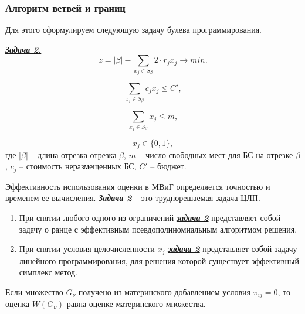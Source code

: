 \begin{frame}
    
    \frametitle{Алгоритм ветвей и границ}
    \fontsize{8pt}{7.2}\selectfont
    Для этого сформулируем следующую задачу булева программирования.

    \underline{\textit{\textbf{Задача 2.}}}
    \begin{displaymath}\label{present:task2}
        z = |\beta| - \sum\limits_{x_j \in S_\beta} 2 \cdot r_j x_j \rightarrow min.
    \end{displaymath}

    \begin{displaymath}\label{eq:part4_task2_cost}
        \sum\limits_{x_j \in S_\beta} c_j x_j \leqslant C',
    \end{displaymath}

    \begin{displaymath}\label{eq:part4_task2_m}
        \sum\limits_{x_j \in S_\beta} x_j \leqslant m,
    \end{displaymath}

    \begin{displaymath}
        x_j \in \{0, 1\},
    \end{displaymath}
    где $|\beta|$ -- длина отрезка отрезка  $\beta$, $m$ -- число свободных мест для БС на отрезке $\beta$, $c_j$ -- стоимость неразмещенных БС, $C'$ -- бюджет.

    \bigskip
    Эффективность использования оценки в МВиГ определяется точностью и временем ее вычисления. \underline{\textit{\textbf{Задача 2}}} -- это труднорешаемая задача ЦЛП.
    
    \begin{enumerate}
        \item При снятии любого одного из ограничений \underline{\textit{\textbf{задача 2}}} представляет собой задачу о ранце с эффективным псевдополиномиальным алгоритмом решения.
        \item При снятии условия целочисленности $x_j$ \underline{\textit{\textbf{задача 2}}} представляет собой задачу линейного программирования, для решения которой существует эффективный симплекс метод.
    \end{enumerate}
    
    

 
    \bigskip
    Если множество $G_\nu$ получено из материнского добавлением условия $\pi_{ij}=0$, то оценка $W(G_\nu)$ равна оценке материнского множества.

\end{frame}

